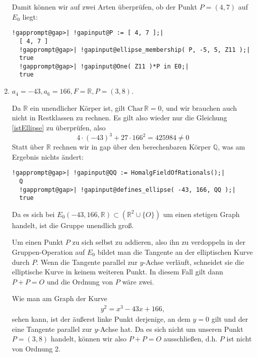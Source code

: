 \begin{enumerate}[label=\alph*)]
Damit können wir auf zwei Arten überprüfen, ob der Punkt $P = (4, 7)$ auf $E_{0}$ liegt:

\begin{Verbatim}[commandchars=!@|,fontsize=\small,frame=single,label=Example]
  !gapprompt@gap>| !gapinput@P := [ 4, 7 ];|
  [ 4, 7 ]
  !gapprompt@gap>| !gapinput@ellipse_membership( P, -5, 5, Z11 );|
  true
  !gapprompt@gap>| !gapinput@One( Z11 )*P in E0;|
  true
\end{Verbatim}

\item $a_{4} = -43, a_{6} = 166, F = \mathbb{R}, P = (3, 8)$.

Da $\mathbb{R}$ ein unendlicher Körper ist, gilt $\mathrm{Char}\,\mathbb{R} = 0$, und wir brauchen auch nicht in Restklassen zu rechnen.
Es gilt also wieder nur die Gleichung \eqref{istEllipse} zu überprüfen, also
\[
4\cdot (-43)^{3} + 27\cdot 166^{2} = 425984 \neq 0
\]
Statt über $\mathbb{R}$ rechnen wir in gap über den berechenbaren Körper $\mathbb{Q}$, was am Ergebnis nichts ändert:

\begin{Verbatim}[commandchars=!@|,fontsize=\small,frame=single,label=Example]
  !gapprompt@gap>| !gapinput@QQ := HomalgFieldOfRationals();|
  Q
  !gapprompt@gap>| !gapinput@defines_ellipse( -43, 166, QQ );|
  true
\end{Verbatim}

Da es sich bei $E_{0}( -43, 166, \mathbb{R}) \subset (\mathbb{R}^{2} \cup \{O\})$ um einen stetigen Graph handelt, ist die Gruppe
unendlich groß.

Um einen Punkt $P$ zu sich selbst zu addieren, also ihn zu verdoppeln in der Gruppen-Operation auf $E_{0}$ bildet man die Tangente an der
elliptischen Kurve durch $P$. Wenn die Tangente parallel zur $y$-Achse verläuft, schneidet sie die elliptische Kurve in keinem weiteren Punkt.
In diesem Fall gilt dann $P + P = O$ und die Ordnung von $P$ wäre zwei.

Wie man am Graph der Kurve
\begin{align*}
y^2 = x^{3} - 43x + 166,
\end{align*}
sehen kann, ist der äußerst linke Punkt derjenige, an dem $y = 0$ gilt und der eine Tangente parallel zur $y$-Achse hat.
Da es sich nicht um unseren Punkt $P = (3, 8)$ handelt, können wir also $P + P = O$ ausschließen, d.h. $P$ ist nicht von Ordnung 2.


\end{enumerate}
